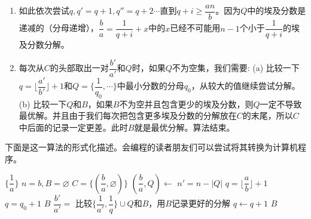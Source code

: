 \begin{enumerate}[1)]
  \item 如此依次尝试$q, q' = q + 1, q'' = q + 2 \cdots $直到$q + i \geq \dfrac{an}{b}$。因为$Q$中的埃及分数是递减的（分母递增），$\dfrac{b}{a} = \dfrac{1}{q+i} + x$中的$x$已经不可能用$n-1$个小于$\dfrac{1}{q+i}$的埃及分数分解。
  \item 每次从$C$的头部取出一对$\dfrac{b'}{a'}$和$Q$时，如果$Q$不为空集，我们需要: (a) 比较一下$q = \lfloor \dfrac{a'}{b'} \rfloor + 1$和$Q = \{\dfrac{1}{q_0}, \cdots \}$中最小分数的分母$q_0$，从较大的值继续尝试分解。(b) 比较一下$Q$和$B$，如果$B$不为空并且包含更少的埃及分数，则$Q$一定不导致最优解。并且由于我们每次把包含更多埃及分数的分解放在$C$的末尾，所以$C$中后面的记录一定更差。此时$B$就是最优分解。算法结束。
\end{enumerate}

下面是这一算法的形式化描述。会编程的读者朋友们可以尝试将其转换为计算机程序。

\begin{algorithmic}[1]
    \State \Return $\{\dfrac{1}{a}\}$
  \EndIf
  \State $n = b, B = \varnothing$
  \State $C = \{(\dfrac{b}{a}, \varnothing)\}$
    \State $(\dfrac{b}{a}, Q) \gets $   
    \State $n' = n - |Q|$                            
    \State $q = \lfloor \dfrac{a}{b} \rfloor + 1$
      
      \State $q = q_0 + 1$
    \EndIf
       
        \State \Return $B$
      \EndIf
      \State $\dfrac{b'}{a'} = $  
        \State 比较$\{\dfrac{1}{a'}, \dfrac{1}{q}\} \cup Q$和$B$，用$B$记录更好的分解
      \Else
        \State {} 
      \EndIf
      \State $q \gets q + 1$
    \EndWhile
  \EndWhile
  \State \Return $B$
\EndFunction
\end{algorithmic}
